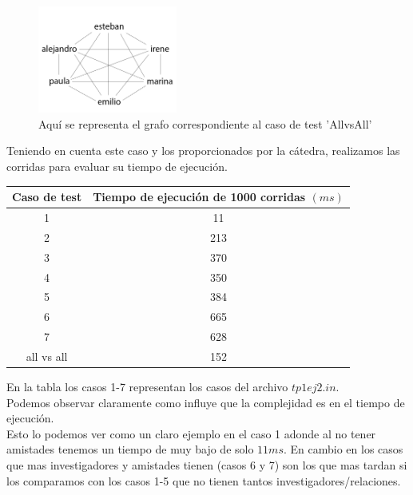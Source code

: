 \begin{figure}[h]
\centering                                                       
        \includegraphics[width=130pt]{./figs/todosVStodos.png}
	\caption{Aquí se representa el grafo correspondiente al caso de test 'AllvsAll'}
	\label{fig:tvst}
\end{figure}
\indent Teniendo en cuenta este caso y los proporcionados por la cátedra, realizamos las corridas para evaluar su tiempo de ejecución.
\begin{center}
\begin{tabular}{|c|c|}
  \hline
  Caso de test & Tiempo de ejecución de 1000 corridas $(ms)$   \\
  \hline
  1        &  11   \\
  \hline
  2        & 213\\
  \hline
  3        & 370      \\
  \hline
  4        & 350        \\
  \hline
  5  	   & 384    \\
  \hline
  6        & 665\\
  \hline
   7 	& 628        \\
  \hline  
  all vs all 	& 152        \\
  \hline
\end{tabular}
\end{center}

\indent En la tabla los casos 1-7 representan los casos del archivo $tp1ej2.in$.\\
\indent Podemos observar claramente como influye que la complejidad es  en el tiempo de ejecución. \\
\indent Esto lo podemos ver como un claro ejemplo en el caso 1 adonde al no tener amistades tenemos un tiempo de muy bajo de solo $11ms$.
En cambio en los casos que mas investigadores y amistades tienen (casos 6 y 7) son los que mas tardan si los comparamos con los casos 1-5 que no tienen tantos investigadores/relaciones.
